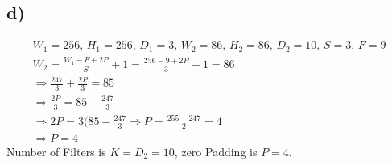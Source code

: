 \documentclass[]{article}
\begin{document}
\subsection*{d)}
\begin{align*}
W_1 = 256,\, H_1 = 256,\, D_1 =3 ,\, W_2 = 86,\, H_2 = 86,\, D_2 = 10,\, S = 3,\, F = 9\\
W_2 = \frac{W_1 - F +2P}{S} + 1 = \frac{256 - 9 + 2P}{3} + 1 = 86 \\
\Rightarrow \frac{247}{3} + \frac{2P}{3} = 85 \\
\Rightarrow \frac{2P}{3} = 85 - \frac{247}{3} \\
\Rightarrow 2P = 3(85 - \frac{247}{3} \Rightarrow P = \frac{255 - 247}{2} = 4 \\
\Rightarrow P = 4 
\end{align*}
Number of Filters is $K = D_2 = 10$, zero Padding is $P = 4$.
\end{document}
